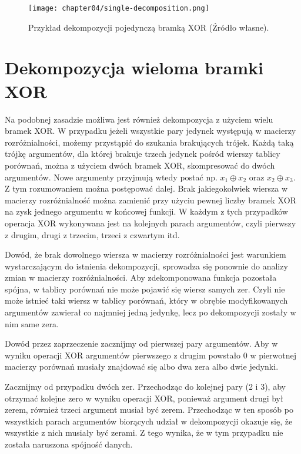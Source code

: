 \begin{figure}[H]
\centering
\texttt{[image: chapter04/single-decomposition.png]}
\caption{Przykład dekompozycji pojedynczą bramką XOR (Źródło własne).}
\label{fig:xor}
\end{figure}

\section{Dekompozycja wieloma bramki XOR}

Na podobnej zasadzie możliwa jest również dekompozycja z użyciem wielu bramek XOR.
W przypadku jeżeli wszystkie pary jedynek występują w macierzy rozróżnialności,
możemy przystąpić do szukania brakujących trójek.
Każdą taką trójkę argumentów,
dla której brakuje trzech jedynek pośród wierszy tablicy porównań,
można z użyciem dwóch bramek XOR,
skompresować do dwóch argumentów.
Nowe argumenty przyjmują wtedy postać np. $x_1 \oplus x_2$ oraz $x_2 \oplus x_3$.
Z tym rozumowaniem można postępować dalej.
Brak jakiegokolwiek wiersza w macierzy rozróżnialność można zamienić przy użyciu pewnej liczby bramek XOR na zysk jednego argumentu w końcowej funkcji.
W każdym z tych przypadków operacja XOR wykonywana jest na kolejnych parach argumentów,
czyli pierwszy z drugim,
drugi z trzecim,
trzeci z czwartym itd.

Dowód,
że brak dowolnego wiersza w macierzy rozróżnialności jest warunkiem wystarczającym do istnienia dekompozycji,
sprowadza się ponownie do analizy zmian w macierzy rozróżnialności.
Aby zdekomponowana funkcja pozostała spójna,
w tablicy porównań nie może pojawić się wiersz samych zer.
Czyli nie może istnieć taki wiersz w tablicy porównań,
który w obrębie modyfikowanych argumentów zawierał co najmniej jedną jedynkę,
lecz po dekompozycji zostały w nim same zera.

Dowód przez zaprzeczenie zacznijmy od pierwszej pary argumentów.
Aby w wyniku operacji XOR argumentów pierwszego z drugim powstało 0 w pierwotnej macierzy porównań musiały znajdować się albo dwa zera albo dwie jedynki.

Zacznijmy od przypadku dwóch zer.
Przechodząc do kolejnej pary (2 i 3),
aby otrzymać kolejne zero w wyniku operacji XOR,
ponieważ argument drugi był zerem,
również trzeci argument musiał być zerem.
Przechodząc w ten sposób po wszystkich parach argumentów biorących udział w dekompozycji okazuje się,
że wszystkie z nich musiały być zerami.
Z tego wynika,
że w tym przypadku nie została naruszona spójność danych.

